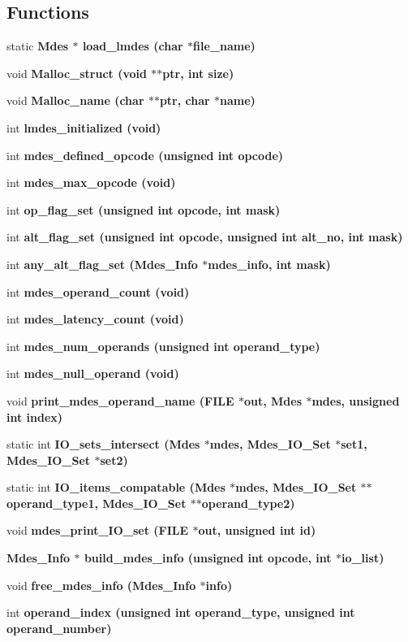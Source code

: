 \subsection*{Functions}
\begin{CompactItemize}
\item 
static \bf{Mdes} $\ast$ \bf{load\_\-lmdes} (char $\ast$file\_\-name)
\item 
void \bf{Malloc\_\-struct} (void $\ast$$\ast$ptr, int size)
\item 
void \bf{Malloc\_\-name} (char $\ast$$\ast$ptr, char $\ast$\bf{name})
\item 
int \bf{lmdes\_\-initialized} (void)
\item 
int \bf{mdes\_\-defined\_\-opcode} (unsigned int opcode)
\item 
int \bf{mdes\_\-max\_\-opcode} (void)
\item 
int \bf{op\_\-flag\_\-set} (unsigned int opcode, int mask)
\item 
int \bf{alt\_\-flag\_\-set} (unsigned int opcode, unsigned int alt\_\-no, int mask)
\item 
int \bf{any\_\-alt\_\-flag\_\-set} (\bf{Mdes\_\-Info} $\ast$mdes\_\-info, int mask)
\item 
int \bf{mdes\_\-operand\_\-count} (void)
\item 
int \bf{mdes\_\-latency\_\-count} (void)
\item 
int \bf{mdes\_\-num\_\-operands} (unsigned int operand\_\-type)
\item 
int \bf{mdes\_\-null\_\-operand} (void)
\item 
void \bf{print\_\-mdes\_\-operand\_\-name} (FILE $\ast$out, \bf{Mdes} $\ast$mdes, unsigned int index)
\item 
static int \bf{IO\_\-sets\_\-intersect} (\bf{Mdes} $\ast$mdes, \bf{Mdes\_\-IO\_\-Set} $\ast$set1, \bf{Mdes\_\-IO\_\-Set} $\ast$set2)
\item 
static int \bf{IO\_\-items\_\-compatable} (\bf{Mdes} $\ast$mdes, \bf{Mdes\_\-IO\_\-Set} $\ast$$\ast$operand\_\-type1, \bf{Mdes\_\-IO\_\-Set} $\ast$$\ast$operand\_\-type2)
\item 
void \bf{mdes\_\-print\_\-IO\_\-set} (FILE $\ast$out, unsigned int id)
\item 
\bf{Mdes\_\-Info} $\ast$ \bf{build\_\-mdes\_\-info} (unsigned int opcode, int $\ast$io\_\-list)
\item 
void \bf{free\_\-mdes\_\-info} (\bf{Mdes\_\-Info} $\ast$info)
\item 
int \bf{operand\_\-index} (unsigned int operand\_\-type, unsigned int operand\_\-number)

\end{CompactItemize}
